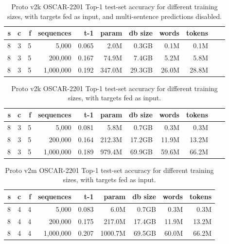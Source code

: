 \begin{table}[H]
\centering
\caption{Proto v2k OSCAR-2201 Top-1 test-set accuracy for different training sizes, with targets fed as input, and multi-sentence predictions disabled.}
\label{tab:protov2k-oscar-test-top1-accuracy}
\begin{tabular}{rrrrrrrrrrr}
\toprule
\textbf{s} & \textbf{c} & \textbf{f} & \textbf{sequences} & \textbf{t-1} & \textbf{param} & \textbf{db size} & \textbf{words} & \textbf{tokens} \\
\midrule
8 & 3 & 5 & 5,000     & 0.065 & 2.0M & 0.3GB & 0.1M & 0.1M \\
8 & 3 & 5 & 200,000   & 0.167 & 74.9M & 7.4GB &	5.2M & 5.8M \\
8 & 3 & 5 & 1,000,000 & 0.192 & 347.0M & 29.3GB & 26.0M & 28.8M \\
\bottomrule
\end{tabular}
\end{table}

\begin{table}[H]
\centering
\caption{Proto v2k OSCAR-2201 Top-1 test-set accuracy for different training sizes, with targets fed as input.}
\label{tab:protov2k-oscar-test-top1-accuracy-multisentencePredictions}
\begin{tabular}{rrrrrrrrrrr}
\toprule
\textbf{s} & \textbf{c} & \textbf{f} & \textbf{sequences} & \textbf{t-1} & \textbf{param} & \textbf{db size} & \textbf{words} & \textbf{tokens} \\
\midrule
8 & 3 & 5 & 5,000     & 0.081 & 5.8M & 0.7GB & 0.3M & 0.3M \\
8 & 3 & 5 & 200,000   & 0.164 & 212.3M & 17.2GB & 11.9M & 13.2M \\
8 & 3 & 5 & 1,000,000 & 0.189 & 979.4M & 69.9GB & 59.6M & 66.2M \\
\bottomrule
\end{tabular}
\end{table}

\begin{table}[H]
\centering
\caption{Proto v2m OSCAR-2201 Top-1 test-set accuracy for different training sizes, with targets fed as input.}
\label{tab:protov2m-oscar-test-top1-accuracy-inferenceLeakyIntegrateAndFire}
\begin{tabular}{rrrrrrrrr}
\toprule
\textbf{s} & \textbf{c} & \textbf{f} & \textbf{sequences} & \textbf{t-1} & \textbf{param} & \textbf{db size} & \textbf{words} & \textbf{tokens} \\
\midrule
8 & 4 & 4 & 5,000     & 0.083 & 6.0M & 0.7GB & 0.3M & 0.3M \\
8 & 4 & 4 & 200,000   & 0.175 & 217.0M & 17.4GB & 11.9M & 13.2M \\
8 & 4 & 4 & 1,000,000 & 0.207 & 1000.7M & 69.5GB & 60.0M & 66.2M \\
\bottomrule
\end{tabular}
\end{table}

